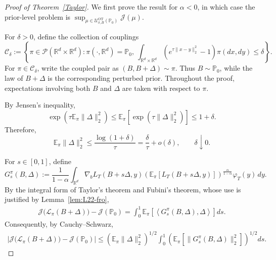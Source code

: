 \documentclass[11pt]{article}
\theoremstyle{definition}
\newcommand{\E}{\mathbb{E}}
\begin{document}
\begin{proof}[Proof of Theorem~\ref{Taylor}]
We first prove the result for $\alpha<0$, in which case the
prior-level problem is $\sup_{\mu\in
\mathcal U_{\delta,B}^{\mathrm{OT}}(\mathbb P_0)}
\mathcal J(\mu).$

For $\delta>0$, define the collection of couplings
\[
\mathcal C_\delta
:=
\left\{
\pi\in\mathcal P(\mathbb R^d\times\mathbb R^d):
\pi(\cdot,\mathbb R^d)=\mathbb P_0,\ 
\int_{\mathbb R^d\times\mathbb R^d}
\left(e^{\tau\|x-y\|_2^2}-1\right)\pi(dx,dy)\le\delta
\right\}.
\]
For $\pi\in\mathcal C_\delta$, write the coupled pair as $(B,B+\Delta)\sim\pi.$
Thus $B\sim\mathbb P_0$, while the law of $B+\Delta$ is the
corresponding perturbed prior. Throughout the proof, expectations
involving both $B$ and $\Delta$ are taken with respect to $\pi$.

By Jensen's inequality,
\[
\exp\!\left(
\tau\E_\pi\|\Delta\|_2^2
\right)
\le
\E_\pi
\left[
\exp\!\left(
\tau\|\Delta\|_2^2
\right)
\right]
\le
1+\delta.
\]
Therefore,
\begin{equation}\label{eq:Delta-L2-small}
\E_\pi\|\Delta\|_2^2
\le
\frac{\log(1+\delta)}{\tau}
=
\frac{\delta}{\tau}
+
o(\delta),
\qquad
\delta\downarrow0.
\end{equation}

For $s\in[0,1]$, define
\[
G_s^\pi(B,\Delta)
:=
\frac{1}{1-\alpha}
\int_{\mathbb R^d}
\nabla_bL_T(B+s\Delta,y)
\left(
\E_\pi[L_T(B+s\Delta,y)]
\right)^{\frac{\alpha}{1-\alpha}}
\varphi_T(y)\,dy.
\]
By the integral form of Taylor's theorem and Fubini's theorem, whose
use is justified by Lemma~\ref{lem:L22-fro},
\begin{align}\label{eq:J-coupling-expansion}
\mathcal J\bigl(\mathcal L_\pi(B+\Delta)\bigr)
-
\mathcal J(\mathbb P_0)
=
\int_0^1
\E_\pi
\left[
\left\langle
G_s^\pi(B,\Delta),\Delta
\right\rangle
\right]
ds.    
\end{align}
Consequently, by Cauchy--Schwarz,
\begin{align}\label{eq:J-upper-cs}
\left|
\mathcal J\bigl(\mathcal L_\pi(B+\Delta)\bigr)
-
\mathcal J(\mathbb P_0)
\right|
\le
\left(
\E_\pi\|\Delta\|_2^2
\right)^{1/2}
\int_0^1
\left(
\E_\pi
\left[
\|G_s^\pi(B,\Delta)\|_2^2
\right]
\right)^{1/2}
ds.
\end{align}


\end{proof}
\end{document}
